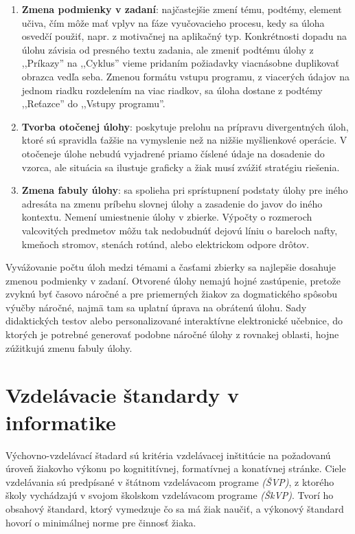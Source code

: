 \begin{enumerate}[label=\alph*),noitemsep,topsep=0pt]
\item \textbf{Zmena podmienky v zadaní}: najčastejšie zmení tému, podtémy, element učiva, čím môže mať vplyv na fáze vyučovacieho procesu, kedy sa úloha osvedčí použiť, napr. z motivačnej na aplikačný typ. Konkrétnosti dopadu na úlohu závisia od presného textu zadania, ale zmeniť podtému úlohy z ,,Príkazy'' na ,,Cyklus'' vieme pridaním požiadavky viacnásobne duplikovať obrazca vedľa seba. Zmenou formátu vstupu programu, z viacerých údajov na jednom riadku rozdelením na viac riadkov, sa úloha dostane z podtémy ,,Reťazce'' do ,,Vstupy programu''.
\item \textbf{Tvorba otočenej úlohy}: poskytuje prelohu na prípravu divergentných úloh, ktoré sú spravidla ťažšie na vymyslenie než na nižšie myšlienkové operácie. V otočeneje úlohe nebudú vyjadrené priamo číslené údaje na dosadenie do vzorca, ale situácia sa ilustuje  graficky a žiak musí zvážiť stratégiu riešenia.
\item \textbf{Zmena fabuly úlohy}: sa spolieha pri sprístupnení podstaty úlohy pre iného adresáta na zmenu príbehu slovnej úlohy a zasadenie do javov do iného kontextu. Nemení umiestnenie úlohy v zbierke. Výpočty o rozmeroch valcovitých predmetov môžu tak nedobudnúť dejovú líniu o bareloch nafty, kmeňoch stromov, stenách rotúnd, alebo elektrickom odpore drôtov.
\end{enumerate}

Vyvážovanie počtu úloh medzi témami a časťami zbierky sa najlepšie dosahuje zmenou podmienky v zadaní. Otvorené úlohy nemajú hojné zastúpenie, pretože zvyknú byť časovo náročné a pre priemerných žiakov za dogmatického spôsobu výučby náročné, najmä tam sa uplatní úprava na obrátenú úlohu. Sady didaktických testov alebo personalizované interaktívne elektronické učebnice, do ktorých je potrebné generovať podobne náročné úlohy z rovnakej oblasti, hojne zúžitkujú zmenu fabuly úlohy.

\section{Vzdelávacie štandardy v informatike}
Výchovno-vzdelávací štadard sú kritéria vzdelávacej inštitúcie na požadovanú úroveň žiakovho výkonu po kognititívnej, formatívnej a konatívnej stránke. Ciele vzdelávania sú predpísané v štátnom vzdelávacom programe \emph{(ŠVP)}, z ktorého školy vychádzajú v svojom školskom vzdelávacom programe \emph{(ŠkVP)}. Tvorí ho obsahový štandard, ktorý vymedzuje čo sa má žiak naučiť, a výkonový štandard hovorí o minimálnej norme pre činnosť žiaka.


